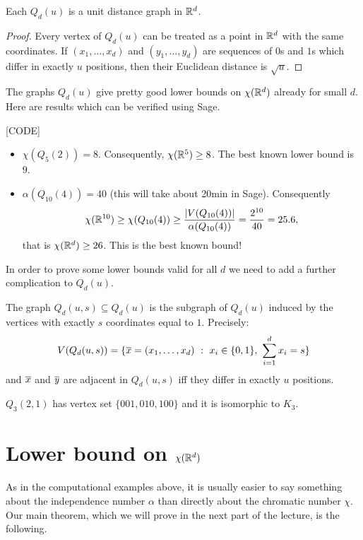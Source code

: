 \begin{lemma}
Each $Q_d(u)$ is a unit distance graph in $\mathbb{R}^d$.
\end{lemma}
\begin{proof}
Every vertex of $Q_d(u)$ can be treated as a point in $\mathbb{R}^d$ with the same coordinates. If $(x_1,\ldots,x_d)$ and $(y_1,\ldots,y_d)$ are sequences of $0$s and $1$s which differ in exactly $u$ positions, then their Euclidean distance is $\sqrt{u}$. 
\end{proof}

The graphs $Q_d(u)$ give pretty good lower bounds on $\chi(\mathbb{R}^d)$ already for small $d$. Here are results which can be verified using Sage.

[CODE]

\begin{itemize}
\item $\chi(Q_5(2))=8$. Consequently, $\chi(\mathbb{R}^5)\geq 8$. The best known lower bound is $9$.
\item $\alpha(Q_{10}(4))=40$ (this will take about 20min in Sage). Consequently
$$\chi(\mathbb{R}^{10})\geq\chi(Q_{10}(4))\geq\frac{|V(Q_{10}(4))|}{\alpha(Q_{10}(4))}=\frac{2^{10}}{40}=25.6,$$
that is $\chi(\mathbb{R}^d)\geq 26$. This is the best known bound!
\end{itemize}

In order to prove some lower bounds valid for all $d$ we need to add a further complication to $Q_d(u)$.

\begin{definition}
The graph $Q_d(u,s)\subseteq Q_d(u)$ is the subgraph of $Q_d(u)$ induced by the vertices with exactly $s$ coordinates equal to $1$. Precisely:
$$V(Q_d(u,s))=\{\oo{x}=(x_1,\ldots,x_d)~:~x_i\in\{0,1\},\ \sum_{i=1}^d x_i=s\}$$
and $\overline{x}$ and $\overline{y}$ are adjacent in $Q_d(u,s)$ iff they differ in exactly $u$ positions.
\end{definition}

\begin{example}
$Q_3(2,1)$ has vertex set $\{001,010,100\}$ and it is isomorphic to $K_3$.
\end{example}

\section{Lower bound on $\chi(\mathbb{R}^d)$}

As in the computational examples above, it is usually easier to say something about the independence number $\alpha$ than directly about the chromatic number $\chi$. Our main theorem, which we will prove in the next part of the lecture, is the following.

